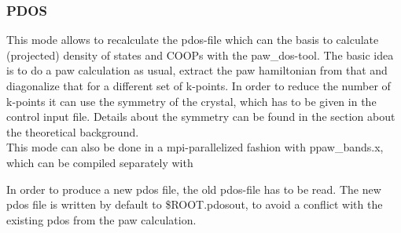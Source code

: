 \documentclass[final,12pt,makeidx,DIV=calc]{article}
\begin{document}
{{{{{{\bigskip{}\bigskip

\subsubsection{PDOS}
This mode allows to recalculate the pdos-file which can the basis to 
calculate (projected) density of states and COOPs with the paw\_dos-tool.
The basic idea is to do a paw calculation as usual, extract the paw 
hamiltonian from that and diagonalize that for a different set of k-points.
In order to reduce the number of k-points it can use the symmetry of the 
crystal, which has to be given in the control input file. Details about 
the symmetry can be found in the section about the theoretical background.
\\
This mode can also be done in a  mpi-parallelized fashion with 
ppaw\_bands.x, which can be compiled separately with 

\bigskip{}\bigskip

\noindent
In order to produce a new pdos file, the old pdos-file has to be read.
The new pdos file is written by default to \$ROOT.pdosout, to avoid a 
conflict with the existing pdos from the paw calculation.


}}}}}}
\end{document}
